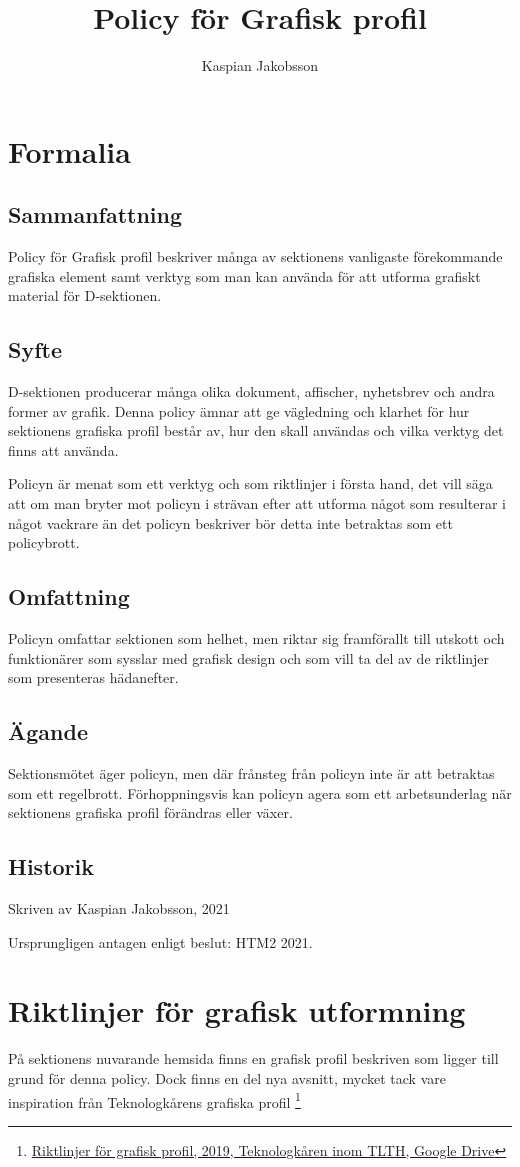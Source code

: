 \documentclass[]{dsekkallelse}
\title{Policy för Grafisk profil}
\author{Kaspian Jakobsson}
\begin{document}
\section{Formalia}

\subsection{Sammanfattning}
Policy för Grafisk profil beskriver många av sektionens vanligaste förekommande grafiska element samt verktyg som man kan använda för att utforma grafiskt material för D-sektionen.

\subsection{Syfte}
D-sektionen producerar många olika dokument, affischer, nyhetsbrev och andra former av grafik. Denna policy ämnar att ge vägledning och klarhet för hur sektionens grafiska profil består av, hur den skall användas och vilka verktyg det finns att använda.

Policyn är menat som ett verktyg och som riktlinjer i första hand, det vill säga att om man bryter mot policyn i strävan efter att utforma något som resulterar i något vackrare än det policyn beskriver bör detta inte betraktas som ett policybrott.

\subsection{Omfattning}
Policyn omfattar sektionen som helhet, men riktar sig framförallt till utskott och funktionärer som sysslar med grafisk design och som vill ta del av de riktlinjer som presenteras hädanefter.

\subsection{Ägande}
Sektionsmötet äger policyn, men där frånsteg från policyn inte är att betraktas som ett regelbrott. Förhoppningsvis kan policyn agera som ett arbetsunderlag när sektionens grafiska profil förändras eller växer.


\subsection{Historik}
Skriven av Kaspian Jakobsson, 2021

Ursprungligen antagen enligt beslut:
HTM2 2021.


\section{Riktlinjer för grafisk utformning}
På sektionens nuvarande hemsida finns en grafisk profil beskriven som ligger till grund för denna policy. Dock finns en del nya avsnitt, mycket tack vare inspiration från Teknologkårens grafiska profil \footnote{\href{https://drive.google.com/file/d/1EFdTyU6aXKSBEj4cqcDsR325LMzTP_um/view}{Riktlinjer för grafisk profil, 2019, Teknologkåren inom TLTH, Google Drive}}
\end{document}
